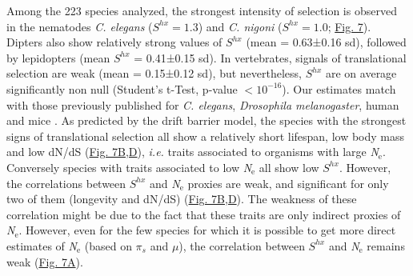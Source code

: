 Among the 223 species analyzed, the strongest intensity of selection is observed in the nematodes \textit{C. elegans} ($S^{hx}=1.3$) and \textit{C. nigoni} ($S^{hx} =1.0$; \hyperref[fig:CU7]{Fig. 7}). Dipters also show relatively strong values of $S^{hx}$ (mean = 0.63±0.16 sd), followed by lepidopters (mean $S^{hx}$ = 0.41±0.15 sd). In vertebrates, signals of translational selection are weak (mean = 0.15±0.12 sd), but nevertheless, $S^{hx}$ are on average significantly non null (Student's t-Test, p-value $<10^{-16}$). Our estimates match with those previously published for \textit{C. elegans}, \textit{Drosophila melanogaster}, human and mice \citep{dos_reis_estimating_2009}. As predicted by the drift barrier model, the species with the strongest signs of translational selection all show a relatively short lifespan, low body mass and low dN/dS (\hyperref[fig:CU7]{Fig. 7B,D}), \textit{i.e.} traits associated to organisms with large \textit{N}$_{\text{e}}$. Conversely species with traits associated to low \textit{N}$_{\text{e}}$ all show low $S^{hx}$. However, the correlations between $S^{hx}$ and \textit{N}$_{\text{e}}$ proxies are weak, and significant for only two of them (longevity and dN/dS) (\hyperref[fig:CU7]{Fig. 7B,D}). The weakness of these correlation might be due to the fact that these traits are only indirect proxies of \textit{N}$_{\text{e}}$. However, even for the few species for which it is possible to get more direct estimates of \textit{N}$_{\text{e}}$ (based on $\pi_s$ and $\mu$), the correlation between $S^{hx}$ and \textit{N}$_{\text{e}}$ remains weak (\hyperref[fig:CU7]{Fig. 7A}). 

